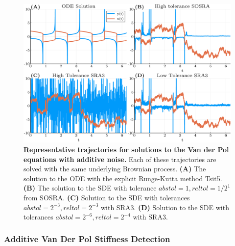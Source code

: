 \documentclass{article}
\begin{document}
\begin{center}
	\begin{figure}
		\begin{centering}
			\includegraphics[scale=0.42]{paper_figures/additive_van_der_pol}
			\par\end{centering}
		\caption{\textbf{Representative trajectories for solutions to the Van der Pol
				equations with additive noise.} Each of these trajectories are solved
			with the same underlying Brownian process. \textbf{(A)} The solution
			to the ODE with the explicit Runge-Kutta method Tsit5. \textbf{(B)
			}The solution to the SDE with tolerance $abstol=1,reltol=1/2^{1}$
			from SOSRA. \textbf{(C) }Solution to the SDE with tolerances $abstol=2^{-3},reltol=2^{-3}$
			with SRA3. \textbf{(D) }Solution to the SDE with tolerances $abstol=2^{-6},reltol=2^{-4}$
			with SRA3.\label{fig:AdditiveVanDerPol}}
	\end{figure}
	\par\end{center}

\subsubsection{Additive Van Der Pol Stiffness Detection}
\end{document}
